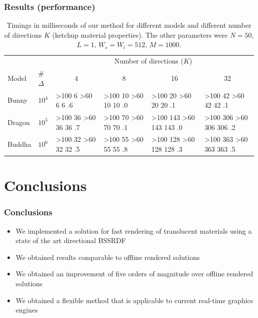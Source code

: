 \documentclass{beamer}
\newcommand\mycolor[1]{
\ifnum#1>100 \cellcolor{redcell}#1%
\else
\ifnum#1>60 \cellcolor{yellowcell}#1%
\else
\cellcolor{greencell}#1%
\fi
\fi
}%
\begin{document}
\begin{frame}
    \frametitle{Results (performance)}
\renewcommand{\arraystretch}{1.8}

\begin{table}[!ht]
\centering
\begin{tabular}{p{3cm}l|l|l|l|l|}
\cline{3-6}
                             &      & \multicolumn{4}{c|}{Number of directions ($K$)}                                          \\ \cline{3-6} 
Model                        & \#$\Delta$& \multicolumn{1}{c|}{4} & \multicolumn{1}{c|}{8} & \multicolumn{1}{c|}{16} & \multicolumn{1}{c|}{32} \\ \hline
\multicolumn{1}{|l|}{Bunny}  & $10^4$ & \mycolor{6}.6                  & \mycolor{10}.0                 & \mycolor{20}.1                  & \mycolor{42}.1                 \\ \hline
\multicolumn{1}{|l|}{Dragon} & $10^5$ & \mycolor{36}.7                 & \mycolor{70}.1                  & \mycolor{143}.0                & \mycolor{306}.2               \\ \hline
\multicolumn{1}{|l|}{Buddha} & $10^6$ & \mycolor{32}.5                 & \mycolor{55}.8                  & \mycolor{128}.3                & \mycolor{363}.5                 \\ \hline
\end{tabular}
\caption{Timings in milliseconds of our method for different models and different number of directions $K$ (ketchup material properties). The other parameters were $N = 50$, $L = 1$, $W_s = W_l = 512$, $M = 1000$.}
\end{table}

\end{frame}


\section{Conclusions}
\begin{frame}
    \frametitle{Conclusions}

\begin{itemize}
\item We implemented a solution for fast rendering of translucent materials using a state of the art directional BSSRDF
\item We obtained results comparable to offline rendered solutions
\item We obtained an improvement of five orders of magnitude over offline rendered solutions
\item We obtained a flexible method that is applicable to current real-time graphics engines
\end{itemize}

\end{frame}
\end{document}

